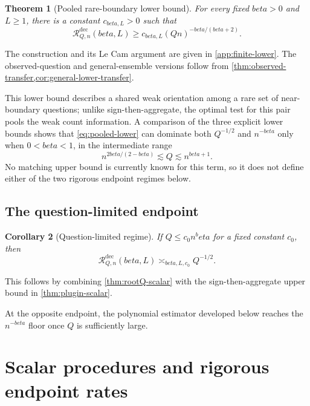 \documentclass[11pt]{article}
\def\beta{beta}%
\newtheorem{theorem}{Theorem}[section]
\newtheorem{corollary}[theorem]{Corollary}
\newcommand{\calR}{\mathcal R}
\begin{document}
\begin{theorem}[Pooled rare-boundary lower bound]
\label{thm:pooled-lower}
For every fixed $\beta>0$ and $L\ge1$, there is a constant $c_{\beta,L}>0$ such that
\begin{equation}
\label{eq:pooled-lower}
\calR^{\mathrm{dec}}_{Q,n}(\beta,L)
\ge
c_{\beta,L}(Qn)^{-\beta/(\beta+2)}.
\end{equation}
\end{theorem}
The construction and its Le Cam argument are given in \cref{app:finite-lower}.  The observed-question and general-ensemble versions follow from \cref{thm:observed-transfer,cor:general-lower-transfer}.

This lower bound describes a shared weak orientation among a rare set of near-boundary questions; unlike sign-then-aggregate, the optimal test for this pair pools the weak count information.  A comparison of the three explicit lower bounds shows that \eqref{eq:pooled-lower} can dominate both $Q^{-1/2}$ and $n^{-\beta}$ only when $0<\beta<1$, in the intermediate range
\[
n^{2\beta/(2-\beta)}
\lesssim Q
\lesssim n^{\beta+1}.
\]
No matching upper bound is currently known for this term, so it does not define either of the two rigorous endpoint regimes below.

\subsection{The question-limited endpoint}

\begin{corollary}[Question-limited regime]
\label{cor:question-limited}
If $Q\le c_0 n^\beta$ for a fixed constant $c_0$, then
\begin{equation}
\label{eq:question-limited}
\calR^{\mathrm{dec}}_{Q,n}(\beta,L)
\asymp_{\beta,L,c_0}
Q^{-1/2}.
\end{equation}
\end{corollary}
This follows by combining \cref{thm:rootQ-scalar} with the sign-then-aggregate upper bound in \cref{thm:plugin-scalar}.

At the opposite endpoint, the polynomial estimator developed below reaches the $n^{-\beta}$ floor once $Q$ is sufficiently large.

\section{Scalar procedures and rigorous endpoint rates}
\label{sec:scalar-estimators}
\end{document}
